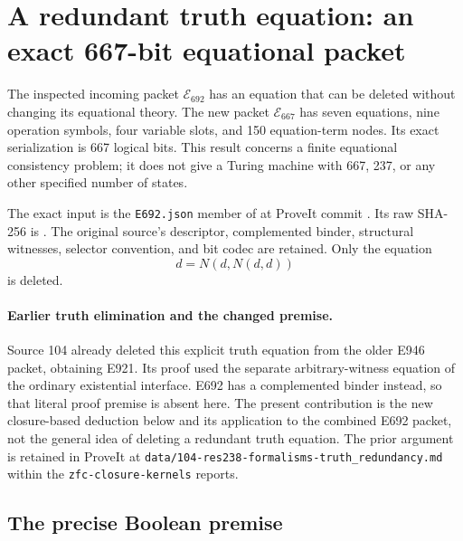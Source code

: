 \section{A redundant truth equation: an exact 667-bit equational packet}
\label{sec:e667}

The inspected incoming packet \(\mathcal E_{692}\) has an equation that can be
deleted without changing its equational theory.  The new packet
\(\mathcal E_{667}\) has seven equations, nine operation symbols, four variable
slots, and 150 equation-term nodes.  Its exact serialization is 667 logical
bits.  This result concerns a finite equational consistency problem; it does
not give a Turing machine with 667, 237, or any other specified number of states.

The exact input is the \texttt{E692.json} member of
 at ProveIt commit
.  Its raw SHA-256 is
.
The original source's descriptor, complemented binder, structural witnesses,
selector convention, and bit codec are retained.  Only the equation
\begin{equation}
                         d=N(d,N(d,d))
\label{eq:e667-deleted}
\end{equation}
is deleted.

\paragraph{Earlier truth elimination and the changed premise.}
Source 104 already deleted this explicit truth equation from the older
E946 packet, obtaining E921.  Its proof used the separate arbitrary-witness
equation of the ordinary existential interface.  E692 has a complemented
binder instead, so that literal proof premise is absent here.  The present
contribution is the new closure-based deduction below and its application
to the combined E692 packet, not the general idea of deleting a redundant
truth equation.  The prior argument is retained in ProveIt at
\texttt{data/104-res238-formalisms-truth\_redundancy.md} within the
\texttt{zfc-closure-kernels} reports.

\subsection{The precise Boolean premise}

